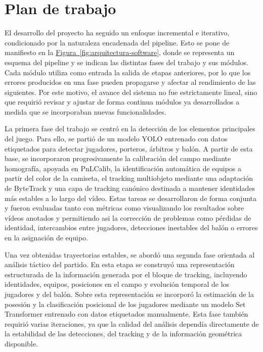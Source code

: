\section{Plan de trabajo}
\label{sec:planTrabajo}

El desarrollo del proyecto ha seguido un enfoque incremental e iterativo, condicionado por la naturaleza encadenada del pipeline. Esto se pone de manifiesto en la \hyperref[fig:arquitectura-software]{Figura~\ref*{fig:arquitectura-software}}, donde se representa un esquema del pipeline y se indican las distintas fases del trabajo y sus módulos.  Cada módulo utiliza como entrada la salida de etapas anteriores, por lo que los errores producidos en una fase pueden propagarse y afectar al rendimiento de las siguientes. Por este motivo, el avance del sistema no fue estrictamente lineal, sino que requirió revisar y ajustar de forma continua módulos ya desarrollados a medida que se incorporaban nuevas funcionalidades.

La primera fase del trabajo se centró en la detección de los elementos principales del juego. Para ello, se partió de un modelo YOLO entrenado con datos etiquetados para detectar jugadores, porteros, árbitros y balón. A partir de esta base, se incorporaron progresivamente la calibración del campo mediante homografía, apoyada en PnLCalib, la identificación automática de equipos a partir del color de la camiseta, el tracking multiobjeto mediante una adaptación de ByteTrack y una capa de tracking canónico destinada a mantener identidades más estables a lo largo del vídeo. Estas tareas se desarrollaron de forma conjunta y fueron evaluadas tanto con métricas como visualizando los resultados sobre vídeos anotados y permitiendo asi la corrección de problemas como pérdidas de identidad, intercambios entre jugadores, detecciones inestables del balón o errores en la asignación de equipo.

Una vez obtenidas trayectorias estables, se abordó una segunda fase orientada al análisis táctico del partido. En esta etapa se construyó una representación estructurada de la información generada por el bloque de tracking, incluyendo identidades, equipos, posiciones en el campo y evolución temporal de los jugadores y del balón. Sobre esta representación se incorporó la estimación de la posesión y la clasificación posicional de los jugadores mediante un modelo Set Transformer entrenado con datos etiquetados manualmente. Esta fase también requirió varias iteraciones, ya que la calidad del análisis dependía directamente de la estabilidad de las detecciones, del tracking y de la información geométrica disponible.


